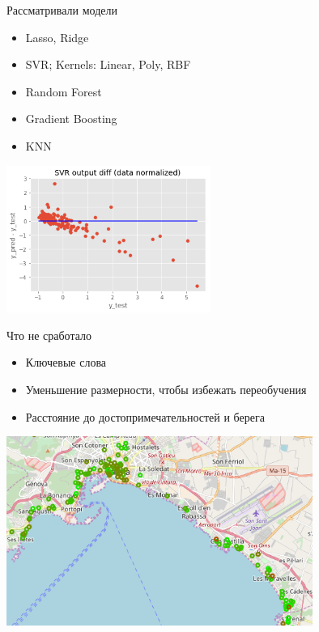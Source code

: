\documentclass[14pt,mathserif,aspectratio=43]{beamer}
\begin{document}
\begin{frame}{Рассматривали модели}

    \begin{itemize}
        \item Lasso, Ridge
        \item SVR; Kernels: Linear, Poly, RBF %
        \item Random Forest
        \item Gradient Boosting
        \item KNN
    \end{itemize}
    
    \begin{center}
        \includegraphics[width=0.5\textwidth]{loss.png}
    \end{center}

\end{frame}


\begin{frame}{Что не сработало}

    \begin{itemize}
        \item Ключевые слова
        \item Уменьшение размерности, чтобы избежать переобучения
        \item Расстояние до достопримечательностей и берега
    \end{itemize}
    
    \begin{center}
        \includegraphics[width=0.75\textwidth]{map_prices.png}
    \end{center}

\end{frame}
\end{document}
